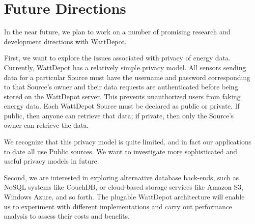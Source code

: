 \documentclass[conference,compsoc]{IEEEtran}
\begin{document}
\section{Future Directions}

In the near future, we plan to work on a number of promising research and
development directions with WattDepot.

First, we want to explore the issues associated with privacy of energy
data.  Currently, WattDepot has a relatively simple privacy model.  All
sensors sending data for a particular Source must have the username and
password corresponding to that Source's owner and their data requests are
authenticated before being stored on the WattDepot server. This prevents
unauthorized users from faking energy data. Each WattDepot Source must be
declared as public or private.  If public, then anyone can retrieve that
data; if private, then only the Source's owner can retrieve the data.  

We recognize that this privacy model is quite limited, and in fact our
applications to date all use Public sources.  We want to investigate more
sophisticated and useful privacy models in future.

Second, we are interested in exploring alternative database back-ends, such
as NoSQL systems like CouchDB, or cloud-based storage services like Amazon
S3, Windows Azure, and so forth. The plugable WattDepot architecture will
enable us to experiment with different implementations and carry out
performance analysis to assess their costs and benefits.



\end{document}
